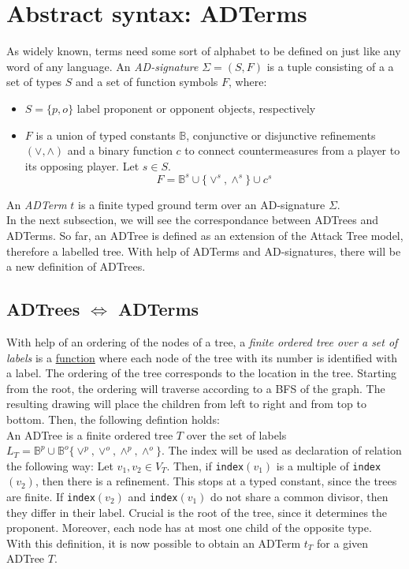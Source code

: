 \documentclass[conference]{IEEEtran}
\begin{document}
\section{Abstract syntax: ADTerms}
As widely known, terms need some sort of alphabet to be defined on just like any word of any language. An \textit{AD-signature} $\Sigma = (S,F)$ is a tuple consisting of a a set of types $S$ and a set of function symbols $F$, where:
\begin{itemize}
	\item $S = \{p,o\}$ label proponent or opponent objects, respectively
	\item $F$ is a union of typed constants $\mathbb{B}$, conjunctive or disjunctive refinements $(\vee,\wedge)$ and a binary function $c$ to connect countermeasures from a player to its opposing player. Let $s \in S$.
	$$F = \mathbb{B}^s \cup \{\vee^s,\wedge^s\}\cup c^s$$
\end{itemize}
An \textit{ADTerm} $t$ is a finite typed ground term over an AD-signature $\Sigma$. \\
In the next subsection, we will see the correspondance between ADTrees and ADTerms. So far, an ADTree is defined as an extension of the Attack Tree model, therefore a labelled tree. With help of ADTerms and AD-signatures, there will be a new definition of ADTrees.
\subsection{ADTrees $\Leftrightarrow$ ADTerms}
With help of an ordering of the nodes of a tree, a \textit{finite ordered tree over a set of labels} is a \underline{function} where each node of the tree with its number is identified with a label. The ordering of the tree corresponds to the location in the tree. Starting from the root, the ordering will traverse according to a BFS of the graph. The resulting drawing will place the children from left to right and from top to bottom. Then, the following defintion holds:\\
An ADTree is a finite ordered tree $T$ over the set of labels $L_T = \mathbb{B}^p \cup \mathbb{B}^o \{\vee^p,\vee^o,\wedge^p,\wedge^o\}$. The index will be used as declaration of relation the following way: Let $v_1,v_2 \in V_T$. Then, if \texttt{index}$(v_1)$ is a multiple of \texttt{index}$(v_2)$, then there is a refinement. This stops at a typed constant, since the trees are finite. If \texttt{index}$(v_2)$ and \texttt{index}$(v_1)$ do not share a common divisor, then they differ in their label. Crucial is the root of the tree, since it determines the proponent. Moreover, each node has at most one child of the opposite type.\\
With this definition, it is now possible to obtain an ADTerm $t_T$ for a given ADTree $T$. 
\end{document}
